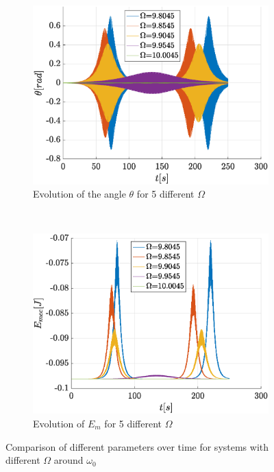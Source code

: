 \documentclass[a4paper,12pt,twoside]{article}
\begin{document}
\begin{figure}[h!]
\centering
	\begin{subfigure}[t]{0.45\textwidth}
		\includegraphics[width=\textwidth]{graphs/c_comptheta.eps}
		\caption{Evolution of the angle $\theta$ for 5 different $\Omega$}
		\label{fig:c-comptheta}
	\end{subfigure}
	~
	\begin{subfigure}[t]{0.45\textwidth}
		\includegraphics[width=\textwidth]{graphs/c_compemec.eps}
		\caption{Evolution of $E_m$ for 5 different $\Omega$}
		\label{fig:c-compemec}
	\end{subfigure}
	\caption{Comparison of different parameters over time for systems with different $\Omega$ around $\omega_0$}
\label{fig:c-comp}
\end{figure}
\end{document}
